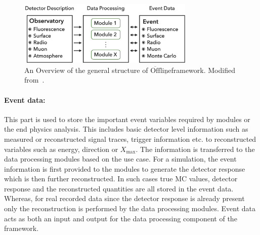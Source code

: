 \begin{figure}[t!]
  \centering
  \includegraphics[width=0.75\textwidth]{thesis_figures/Setup/Offline_schematic.png}
  \caption{An Overview of the general structure of $\mathrm{\overline{Off}\underline{line}}$framework. Modified from~\cite{Argiro:2007qg}. }
  \label{fig:Offline_schematic}
\end{figure}

\paragraph*{Event data:}
This part is used to store the important event variables required by modules or the end physics analysis. This includes basic detector level information such as measured or reconstructed signal traces, trigger information etc. to reconstructed variables such as energy, direction or $X_{\text{max}}$. The information is transferred to the data processing modules based on the use case. For a simulation, the event information is first provided to the modules to generate the detector response which is then further reconstructed. In such cases true \gls{MC} values, detector response and the reconstructed quantities are all stored in the event data. Whereas, for real recorded data since the detector response is already present only the reconstruction is performed by the data processing modules. Event data acts as both an input and output for the data processing component of the framework.

